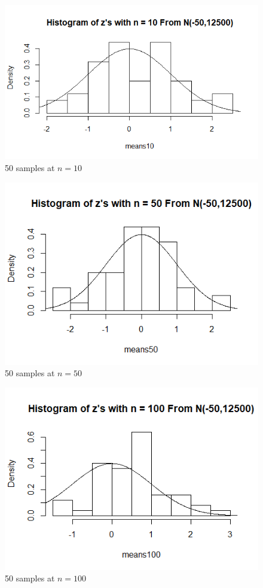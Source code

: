 \documentclass[12pt]{article}
\begin{document}
\begin{figure}[H]
	\centering
	\includegraphics{img/Rplot_4a.png}
	\caption{50 samples at $n=10$}
\end{figure}

\begin{figure}[H]
	\centering
	\includegraphics{img/Rplot_4b.png}
	\caption{50 samples at $n=50$}
\end{figure}

\begin{figure}[H]
	\centering
	\includegraphics{img/Rplot_4c.png}
	\caption{50 samples at $n=100$}
\end{figure}
\end{document}
